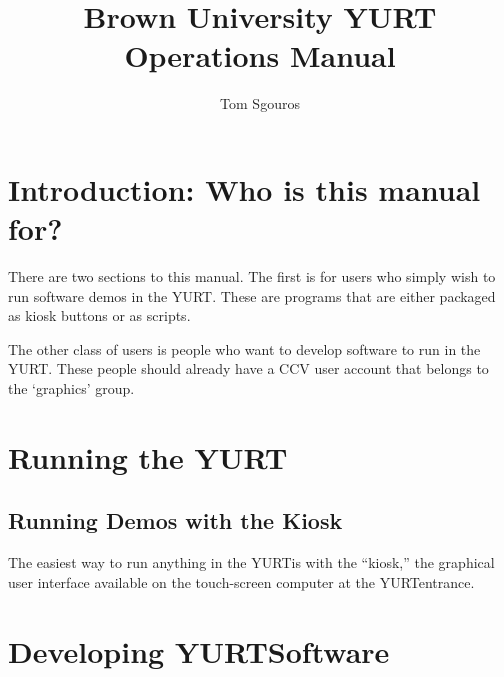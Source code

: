 \documentclass[11pt]{article}
\newcommand{\yurt}{YURT}
\begin{document}
\title{Brown University YURT Operations Manual}
\author{Tom Sgouros}
\maketitle

\tableofcontents

\section{Introduction: Who is this manual for?}

There are two sections to this manual.  The first is for users who
simply wish to run software demos in the \yurt.  These are programs
that are either packaged as kiosk buttons or as scripts.

The other class of users is people who want to develop software to run
in the \yurt.  These people should already have a CCV user account that
belongs to the `graphics' group.

\section{Running the \yurt}

\subsection{Running Demos with the Kiosk}

The easiest way to run anything in the \yurt is with the ``kiosk,''
the graphical user interface available on the touch-screen computer at
the \yurt entrance.


\section{Developing \yurt Software}
\end{document}
